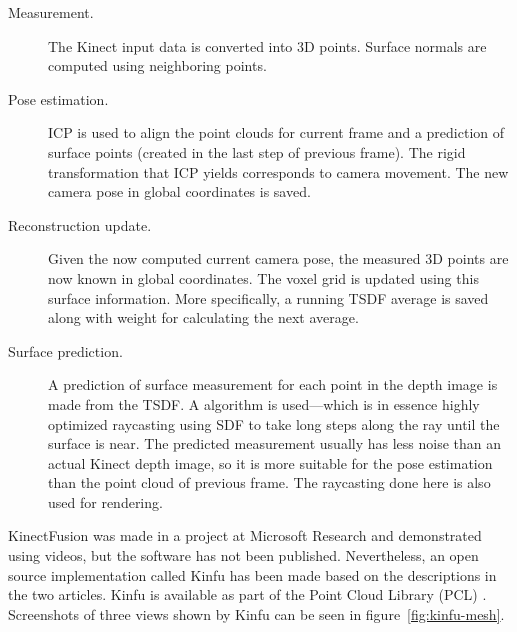 \begin{description}
    \item[Measurement.] The Kinect input data is converted into 3D points. Surface normals are computed using neighboring points.
    \item[Pose estimation.] ICP is used to align the point clouds for current frame and a prediction of surface points (created in the last step of previous frame). The rigid transformation that ICP yields corresponds to camera movement. The new camera pose in global coordinates is saved.
    \item[Reconstruction update.] Given the now computed current camera pose, the measured 3D points are now known in global coordinates. The voxel grid is updated using this surface information. More specifically, a running TSDF average is saved along with weight for calculating the next average.
    \item[Surface prediction.] A prediction of surface measurement for each point in the depth image is made from the TSDF. A  algorithm is used---which is in essence highly optimized raycasting using SDF to take long steps along the ray until the surface is near. The predicted measurement usually has less noise than an actual Kinect depth image, so it is more suitable for the pose estimation than the point cloud of previous frame. The raycasting done here is also used for rendering.
\end{description}

\newtopic

KinectFusion was made in a project at Microsoft Research and demonstrated using videos, but the software has not been published. Nevertheless, an open source implementation called Kinfu has been made based on the descriptions in the two articles. Kinfu is available as part of the Point Cloud Library (PCL) \citep{PCL}. Screenshots of three views shown by Kinfu can be seen in figure~\ref{fig:kinfu-mesh}.

